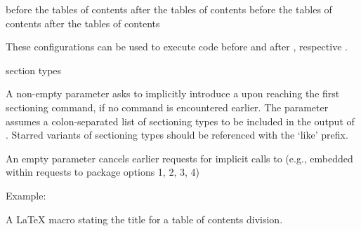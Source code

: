  {before the tables of contents} {after the tables of contents}\EndDoc
{} {before the tables of contents} {after the tables of contents}\EndDoc

These configurations can be used to execute code before and after , respective
.

 {section types}\EndDoc

A non-empty  parameter asks to implicitly introduce
a  upon reaching the first sectioning
command, if no  command is encountered
earlier. The parameter assumes a colon-separated list
of sectioning types to be included in the output
of .  Starred variants of sectioning
types should be referenced with the `like' prefix.

An empty parameter cancels earlier requests for implicit
calls to  (e.g., embedded within requests
to package options 1, 2, 3, 4)

Example:

\begin{texsource}
\end{texsource}

 A \LaTeX{} macro stating the title for a table of contents division.



   


